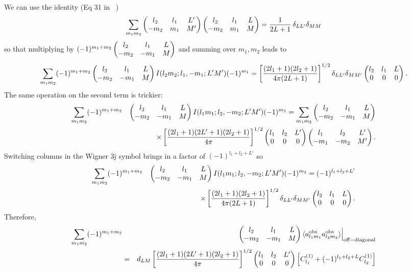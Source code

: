 \documentclass[prd,amsmath,amssymb,floatfix,superscriptaddress,nofootinbib,preprintnumbers]{revtex4-1}
\def\be{\begin{equation}}
\def\ee{\end{equation}}
\def\bea{\begin{eqnarray}}
\def\eea{\end{eqnarray}}
\newcommand{\vs}{\nonumber\\}
\begin{document}
We can use the identity (Eq 31 in ~\cite{Okamoto:2003zw})
\be
\sum_{m_1m_2} 
 \left(\begin{matrix} l_2 & l_1 &L'\cr -m_2&m_1&M'\end{matrix}\right)
 \left(\begin{matrix} l_2 & l_1 &L\cr -m_2&m_1&M\end{matrix}\right)
=\frac{1}{2L+1}\,\delta_{LL'}\delta_{MM}
\ee
so that multiplying by $(-1)^{m_1+m_2} \left(\begin{matrix} l_2 & l_1 &L\cr -m_2&-m_1&M\end{matrix}\right)$ and summing over $m_1,m_2$ leads to
\be
\sum_{m_1m_2}  (-1)^{m_1+m_2} \left(\begin{matrix} l_2 & l_1 &L\cr -m_2&-m_1&M\end{matrix}\right) 
I(l_2m_2;l_1,-m_1;L'M')
 (-1)^{m_1} 
= \left[
\frac{(2l_1+1)(2l_2+1)}{4\pi (2L+1)}\right]^{1/2}\delta_{LL'}\delta_{MM'}\left(\begin{matrix} l_2 & l_1 &L\cr 0&0&0\end{matrix}\right)
.\ee
The same operation on the second term is trickier:
\bea
\sum_{m_1m_2}  (-1)^{m_1+m_2} &&\left(\begin{matrix} l_2 & l_1 &L\cr -m_2&-m_1&M\end{matrix}\right) 
I(l_1m_1;l_2,-m_2;L'M')
 (-1)^{m_2}
 =
 \sum_{m_1m_2}   \left(\begin{matrix} l_2 & l_1 &L\cr -m_2&-m_1&M\end{matrix}\right) 
 \vs
 &&\times\left[ \frac{(2l_1+1)(2L'+1)(2l_2+1)}{4\pi}\right]^{1/2}\left(\begin{matrix} l_1 & l_2 &L'\cr 0&0&0\end{matrix}\right) 
 \left(\begin{matrix} l_1 & l_2 &L'\cr -m_1&-m_2&M'\end{matrix}\right).
 \eea
Switching columns in the Wigner 3j symbol brings in a factor of $(-1)^{l_1+l_2+L'}$ so
\bea
\sum_{m_1m_2}  (-1)^{m_1+m_2} &&\left(\begin{matrix} l_2 & l_1 &L\cr -m_2&-m_1&M\end{matrix}\right) 
I(l_1m_1;l_2,-m_2;L'M')
 (-1)^{m_2}
 =
 (-1)^{l_1+l_2+L'}  
 \vs
 &&\times\left[
\frac{(2l_1+1)(2l_2+1)}{4\pi (2L+1)}\right]^{1/2}\delta_{LL'}\delta_{MM'}\left(\begin{matrix} l_2 & l_1 &L\cr 0&0&0\end{matrix}\right).
 \eea
Therefore,
\bea
\sum_{m_1m_2}  (-1)^{m_1+m_2} &&\left(\begin{matrix} l_2 & l_1 &L\cr -m_2&-m_1&M\end{matrix}\right)
\langle a^{\rm obs}_{l_1m_1} a^{\rm obs}_{l_2m_2} \rangle\Big\vert_{\rm off-diagonal}
\vs
&=& d_{LM} \left[ \frac{(2l_1+1)(2L'+1)(2l_2+1)}{4\pi}\right]^{1/2}\left(\begin{matrix} l_1 & l_2 &L'\cr 0&0&0\end{matrix}\right)
\left[ C^{(1)}_{l_1} + (-1)^{l_1+l_2+L}C^{(1)}_{l_2}\right]
\eea
\end{document}
